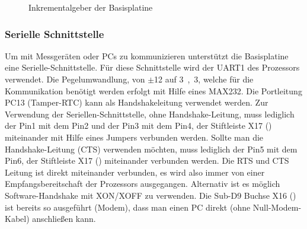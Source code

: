 \begin{figure}[H]
    \centering
    \qquad
    \qquad
    \caption[Inkrementalgeber der Basisplatine]{Inkrementalgeber der \gls{Basisplatine}}
    \label{fig:basisplatine-ink}
\end{figure}

\subsubsection{Serielle Schnittstelle}
Um mit Messgeräten oder PCs zu kommunizieren unterstützt die \gls{Basisplatine} eine Serielle-Schnittstelle. Für diese Schnittstelle wird der UART1 des Prozessors verwendet. Die Pegelumwandlung, von $\pm$\unit{12}{\volt} auf \unit{3,3}{\volt}, welche für die Kommunikation benötigt werden erfolgt mit Hilfe eines MAX232. Die Portleitung PC13 (Tamper-RTC) kann als Handshakeleitung verwendet werden. Zur Verwendung der Seriellen-Schnittstelle, ohne Handshake-Leitung, muss lediglich der Pin1 mit dem Pin2 und der Pin3 mit dem Pin4, der Stiftleiste X17 () miteinander mit Hilfe eines Jumpers verbunden werden. Sollte man die Handshake-Leitung (CTS) verwenden möchten, muss lediglich der Pin5 mit dem Pin6, der Stiftleiste X17 () miteinander verbunden werden. Die RTS und CTS Leitung ist direkt miteinander verbunden, es wird also immer von einer Empfangsbereitschaft der Prozessors ausgegangen. Alternativ ist es möglich Software-Handshake mit XON/XOFF zu verwenden. Die Sub-D9 Buchse X16 () ist bereits so ausgeführt (Modem), dass man einen PC direkt (ohne Null-Modem-Kabel) anschließen kann.

